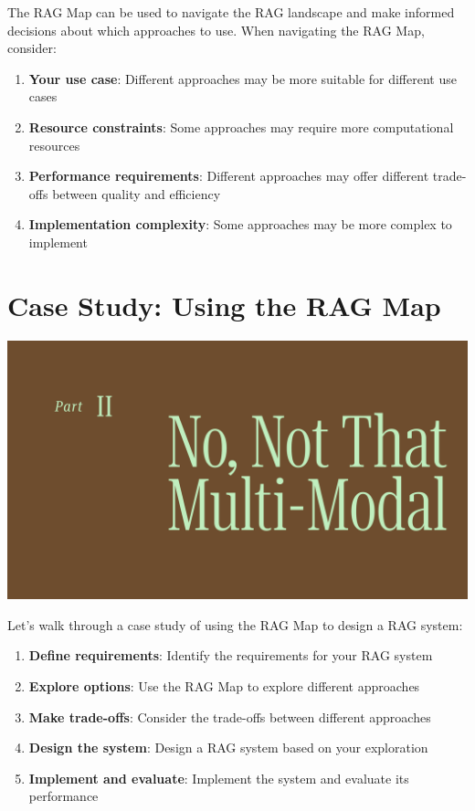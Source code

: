 \documentclass[
  letterpaper,
  oneside]{scrbook}
\providecommand{\tightlist}{%
  \setlength{\itemsep}{0pt}\setlength{\parskip}{0pt}}\usepackage{longtable,booktabs,array}
\begin{document}
The RAG Map can be used to navigate the RAG landscape and make informed
decisions about which approaches to use. When navigating the RAG Map,
consider:

\begin{enumerate}
\def\labelenumi{\arabic{enumi}.}
\tightlist
\item
  \textbf{Your use case}: Different approaches may be more suitable for
  different use cases
\item
  \textbf{Resource constraints}: Some approaches may require more
  computational resources
\item
  \textbf{Performance requirements}: Different approaches may offer
  different trade-offs between quality and efficiency
\item
  \textbf{Implementation complexity}: Some approaches may be more
  complex to implement
\end{enumerate}

\section{Case Study: Using the RAG
Map}\label{case-study-using-the-rag-map}

\includegraphics{chapters/../p5-images/slide_9.png}

Let's walk through a case study of using the RAG Map to design a RAG
system:

\begin{enumerate}
\def\labelenumi{\arabic{enumi}.}
\tightlist
\item
  \textbf{Define requirements}: Identify the requirements for your RAG
  system
\item
  \textbf{Explore options}: Use the RAG Map to explore different
  approaches
\item
  \textbf{Make trade-offs}: Consider the trade-offs between different
  approaches
\item
  \textbf{Design the system}: Design a RAG system based on your
  exploration
\item
  \textbf{Implement and evaluate}: Implement the system and evaluate its
  performance
\end{enumerate}
\end{document}
